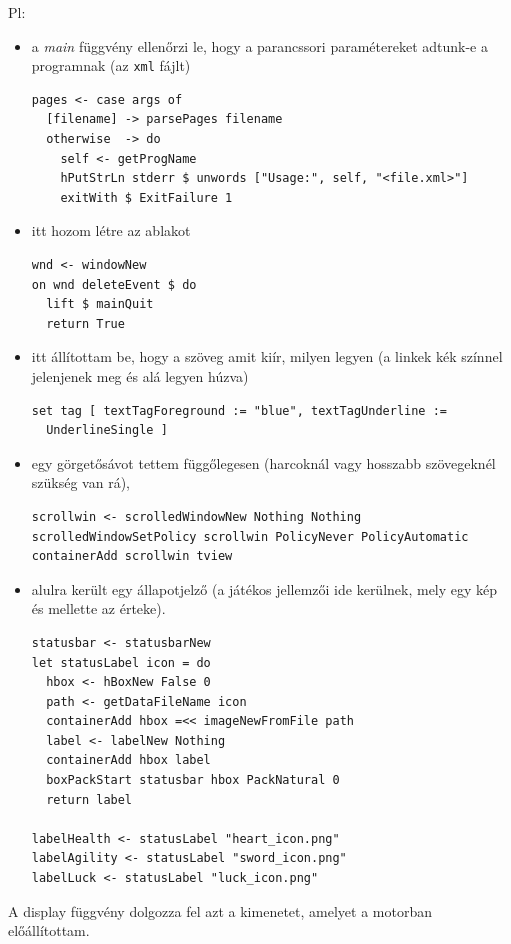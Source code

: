 \documentclass[12pt,a4paper,oneside]{report}
\newcommand{\proglang}{\texttt}
\begin{document}
      Pl:
      \begin{itemize}
        \item a \emph{main} függvény ellenőrzi le, hogy a parancssori
          paramétereket adtunk-e a programnak (az \proglang{xml}
          fájlt)
          \begin{verbatim}
pages <- case args of
  [filename] -> parsePages filename
  otherwise  -> do
    self <- getProgName
    hPutStrLn stderr $ unwords ["Usage:", self, "<file.xml>"]
    exitWith $ ExitFailure 1
          \end{verbatim}
        \item itt hozom létre az ablakot
          \begin{verbatim}
wnd <- windowNew
on wnd deleteEvent $ do
  lift $ mainQuit
  return True
          \end{verbatim}
        \item itt állítottam be, hogy a szöveg amit kiír, milyen
          legyen (a linkek kék színnel jelenjenek meg és alá legyen
          húzva)
          \begin{verbatim}
set tag [ textTagForeground := "blue", textTagUnderline :=
  UnderlineSingle ]
          \end{verbatim}
        \item egy görgetősávot tettem függőlegesen (harcoknál vagy
          hosszabb szövegeknél szükség van rá),
          \begin{verbatim}
scrollwin <- scrolledWindowNew Nothing Nothing
scrolledWindowSetPolicy scrollwin PolicyNever PolicyAutomatic
containerAdd scrollwin tview
          \end{verbatim}
        \item alulra került egy állapotjelző (a játékos jellemzői ide
          kerülnek, mely egy kép és mellette az érteke).
          \begin{verbatim}
statusbar <- statusbarNew
let statusLabel icon = do
  hbox <- hBoxNew False 0
  path <- getDataFileName icon
  containerAdd hbox =<< imageNewFromFile path
  label <- labelNew Nothing
  containerAdd hbox label
  boxPackStart statusbar hbox PackNatural 0
  return label

labelHealth <- statusLabel "heart_icon.png"
labelAgility <- statusLabel "sword_icon.png"
labelLuck <- statusLabel "luck_icon.png"
          \end{verbatim}
      \end{itemize}

      A display függvény dolgozza fel azt a kimenetet, amelyet a
      motorban előállítottam.
\end{document}
